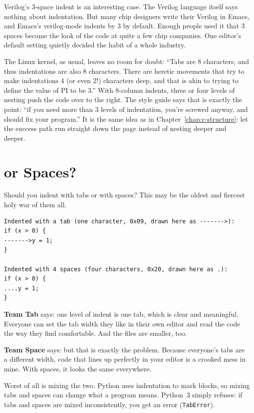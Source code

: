 Verilog's 3-space indent is an interesting case. The Verilog language itself says nothing about indentation. But many chip designers write their Verilog in Emacs, and Emacs's verilog-mode indents by 3 by default. Enough people used it that 3 spaces became the look of the code at quite a few chip companies. One editor's default setting quietly decided the habit of a whole industry.

The Linux kernel, as usual, leaves no room for doubt: ``Tabs are 8 characters, and thus indentations are also 8 characters. There are heretic movements that try to make indentations 4 (or even 2!) characters deep, and that is akin to trying to define the value of PI to be 3.'' With 8-column indents, three or four levels of nesting push the code over to the right. The style guide says that is exactly the point: ``if you need more than 3 levels of indentation, you're screwed anyway, and should fix your program.'' It is the same idea as in Chapter~\ref{chap:c-structure}: let the success path run straight down the page instead of nesting deeper and deeper.

\section{\texorpdfstring{}{Tabs} or Spaces?}

Should you indent with tabs or with spaces? This may be the oldest and fiercest holy war of them all.

\begin{verbatim}
Indented with a tab (one character, 0x09, drawn here as ------->):
if (x > 0) {
------->y = 1;
}

Indented with 4 spaces (four characters, 0x20, drawn here as .):
if (x > 0) {
....y = 1;
}
\end{verbatim}

\textbf{Team Tab} says: one level of indent is one tab, which is clear and meaningful. Everyone can set the tab width they like in their own editor and read the code the way they find comfortable. And the files are smaller, too.

\textbf{Team Space} says: but that is exactly the problem. Because everyone's tabs are a different width, code that lines up perfectly in your editor is a crooked mess in mine. With spaces, it looks the same everywhere.

Worst of all is mixing the two. Python uses indentation to mark blocks, so mixing tabs and spaces can change what a program means. Python~3 simply refuses: if tabs and spaces are mixed inconsistently, you get an error (\texttt{TabError}).

